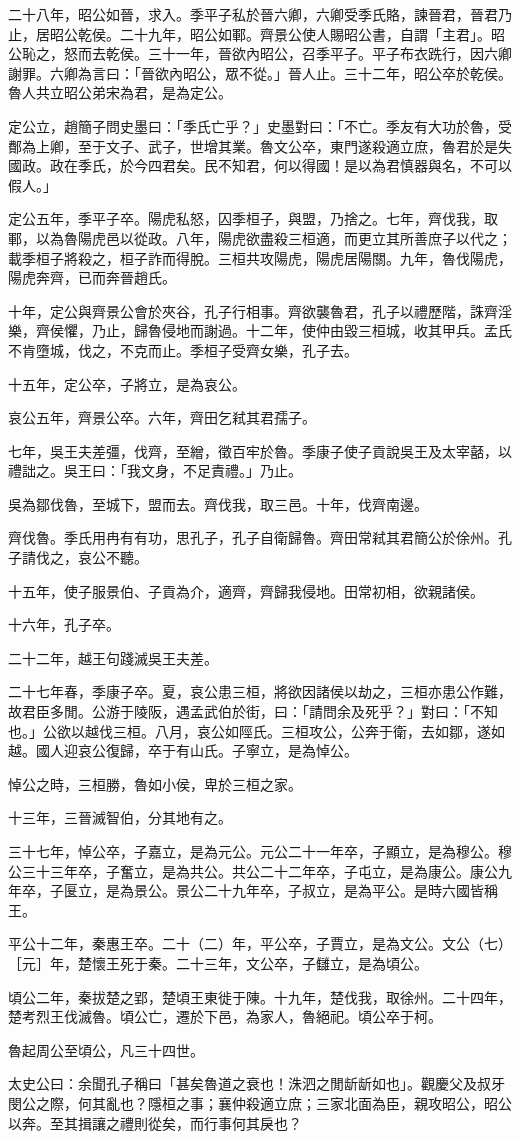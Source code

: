\begin{pinyinscope}
二十八年，昭公如晉，求入。季平子私於晉六卿，六卿受季氏賂，諫晉君，晉君乃止，居昭公乾侯。二十九年，昭公如鄆。齊景公使人賜昭公書，自謂「主君」。昭公恥之，怒而去乾侯。三十一年，晉欲內昭公，召季平子。平子布衣跣行，因六卿謝罪。六卿為言曰：「晉欲內昭公，眾不從。」晉人止。三十二年，昭公卒於乾侯。魯人共立昭公弟宋為君，是為定公。

定公立，趙簡子問史墨曰：「季氏亡乎？」史墨對曰：「不亡。季友有大功於魯，受鄪為上卿，至于文子、武子，世增其業。魯文公卒，東門遂殺適立庶，魯君於是失國政。政在季氏，於今四君矣。民不知君，何以得國！是以為君慎器與名，不可以假人。」

定公五年，季平子卒。陽虎私怒，囚季桓子，與盟，乃捨之。七年，齊伐我，取鄆，以為魯陽虎邑以從政。八年，陽虎欲盡殺三桓適，而更立其所善庶子以代之；載季桓子將殺之，桓子詐而得脫。三桓共攻陽虎，陽虎居陽關。九年，魯伐陽虎，陽虎奔齊，已而奔晉趙氏。

十年，定公與齊景公會於夾谷，孔子行相事。齊欲襲魯君，孔子以禮歷階，誅齊淫樂，齊侯懼，乃止，歸魯侵地而謝過。十二年，使仲由毀三桓城，收其甲兵。孟氏不肯墮城，伐之，不克而止。季桓子受齊女樂，孔子去。

十五年，定公卒，子將立，是為哀公。

哀公五年，齊景公卒。六年，齊田乞弒其君孺子。

七年，吳王夫差彊，伐齊，至繒，徵百牢於魯。季康子使子貢說吳王及太宰嚭，以禮詘之。吳王曰：「我文身，不足責禮。」乃止。

吳為鄒伐魯，至城下，盟而去。齊伐我，取三邑。十年，伐齊南邊。

齊伐魯。季氏用冉有有功，思孔子，孔子自衛歸魯。齊田常弒其君簡公於俆州。孔子請伐之，哀公不聽。

十五年，使子服景伯、子貢為介，適齊，齊歸我侵地。田常初相，欲親諸侯。

十六年，孔子卒。

二十二年，越王句踐滅吳王夫差。

二十七年春，季康子卒。夏，哀公患三桓，將欲因諸侯以劫之，三桓亦患公作難，故君臣多閒。公游于陵阪，遇孟武伯於街，曰：「請問余及死乎？」對曰：「不知也。」公欲以越伐三桓。八月，哀公如陘氏。三桓攻公，公奔于衛，去如鄒，遂如越。國人迎哀公復歸，卒于有山氏。子寧立，是為悼公。

悼公之時，三桓勝，魯如小侯，卑於三桓之家。

十三年，三晉滅智伯，分其地有之。

三十七年，悼公卒，子嘉立，是為元公。元公二十一年卒，子顯立，是為穆公。穆公三十三年卒，子奮立，是為共公。共公二十二年卒，子屯立，是為康公。康公九年卒，子匽立，是為景公。景公二十九年卒，子叔立，是為平公。是時六國皆稱王。

平公十二年，秦惠王卒。二十（二）年，平公卒，子賈立，是為文公。文公（七）［元］年，楚懷王死于秦。二十三年，文公卒，子讎立，是為頃公。

頃公二年，秦拔楚之郢，楚頃王東徙于陳。十九年，楚伐我，取徐州。二十四年，楚考烈王伐滅魯。頃公亡，遷於下邑，為家人，魯絕祀。頃公卒于柯。

魯起周公至頃公，凡三十四世。

太史公曰：余聞孔子稱曰「甚矣魯道之衰也！洙泗之閒龂龂如也」。觀慶父及叔牙閔公之際，何其亂也？隱桓之事；襄仲殺適立庶；三家北面為臣，親攻昭公，昭公以奔。至其揖讓之禮則從矣，而行事何其戾也？


\end{pinyinscope}